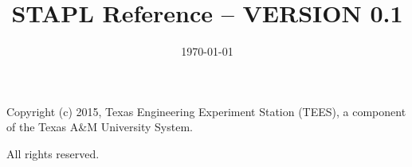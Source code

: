 \documentclass{book}
\begin{document}
\title{STAPL Reference -- VERSION 0.1}
\date{\today}
\maketitle

\newenvironment{hashitemize}{%
  \renewcommand{\labelitemi}{\bfseries \#\#}%
        \begin{itemize}}{\end{itemize}}

\newcommand{\stapl}{{\sc STAPL}}
\newcommand{\stl}{{\sc STL}}
\newcommand{\pview}{{\sc PVIEW}}
\newcommand{\pviews}{{\sc PVIEWS}}
\newcommand{\pcontainer}{{\sc PCONTAINER}}
\newcommand{\pcontainers}{{\sc PCONTAINERS}}

\pagestyle{myheadings}
\renewcommand{\chaptermark}[1]{
              \markboth{*** DRAFT 0.1 *** \chaptername\ \thechapter. #1 } {} }
\renewcommand{\sectionmark}[1]{
              \markright{*** DRAFT 0.1 *** \thesection. #1 } {}}

\setcounter{secnumdepth}{3}


\frontmatter

\vspace*{8cm}
\begin{center}
Copyright (c) 2015, Texas Engineering Experiment Station (TEES), a
component of the Texas A\&M University System.

All rights reserved.
\end{center}
\pagebreak
                                       
\mainmatter





















\backmatter


\end{document}
